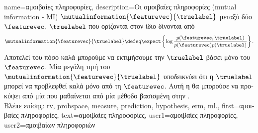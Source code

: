 {name={\foreignlanguage{greek}{αμοιβαίες πληροφορίες}},
	description={\foreignlanguage{greek}{Οι} 
		\foreignlanguage{greek}{αμοιβαίες πληροφορίες} (mutual information - MI) $\mutualinformation{\featurevec}{\truelabel}$ 
 		\foreignlanguage{greek}{μεταξύ δύο}  $\featurevec$, $\truelabel$ \foreignlanguage{greek}{που ορίζονται στον ίδιο} 
		 \foreignlanguage{greek}{δίνονται από} \cite{coverthomas} $$\mutualinformation{\featurevec}{\truelabel} \defeq 
		\expect \left\{ \log \frac{p (\featurevec,\truelabel)}{p(\featurevec)p(\truelabel)} \right\}.$$ 
		\foreignlanguage{greek}{Αποτελεί}  \foreignlanguage{greek}{του πόσο καλά μπορούμε να εκτιμήσουμε την} 
		$\truelabel$ \foreignlanguage{greek}{βάσει μόνο του} $\featurevec$. \foreignlanguage{greek}{Μία μεγάλη τιμή του} 
		$\mutualinformation{\featurevec}{\truelabel}$ \foreignlanguage{greek}{υποδεικνύει ότι η} $\truelabel$ \foreignlanguage{greek}{μπο\-ρεί 
		να προβλεφθεί καλά μόνο από τη} $\featurevec$. \foreignlanguage{greek}{Αυτή η}  \foreignlanguage{greek}{θα 
		μπορούσε να προκύψει από μία}  \foreignlanguage{greek}{που μαθαίνεται από μία μέθοδο}  
		\foreignlanguage{greek}{βασισμένη στην} .
		\\
		\foreignlanguage{greek}{Βλέπε επίσης:} \gls{rv}, \gls{probspace}, \gls{measure}, \gls{prediction}, \gls{hypothesis}, \gls{erm}, \gls{ml}.}, 
	first={\foreignlanguage{greek}{αμοιβαίες πληροφορίες}}, 
	text={\foreignlanguage{greek}{αμοιβαίες πληροφορίες}},
	user1={\foreignlanguage{greek}{αμοιβαίες πληροφορίες}}, %
	user2={\foreignlanguage{greek}{αμοιβαίων πληροφοριών}} %
}
        
